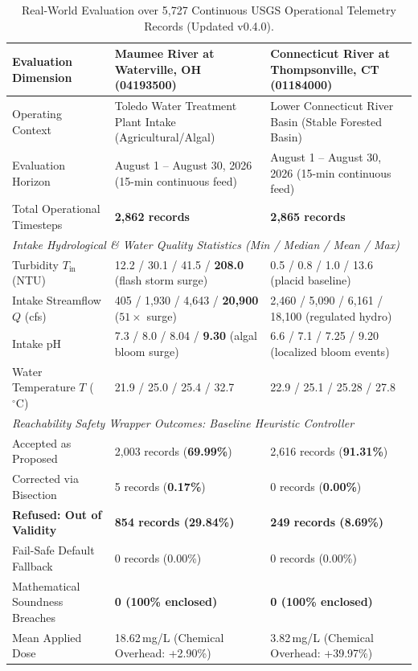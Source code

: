 \documentclass[10pt,twocolumn,letterpaper]{article}
\theoremstyle{definition}
\newcommand{\Tin}{T_{\text{in}}}
\begin{document}
\begin{table}[t]
\centering
\small
\caption{Real-World Evaluation over 5,727 Continuous USGS Operational Telemetry Records (Updated v0.4.0).}
\label{tab:real_world}
\begin{tabularx}{\textwidth}{lXX}
\toprule
\textbf{Evaluation Dimension} & \textbf{Maumee River at Waterville, OH (04193500)} & \textbf{Connecticut River at Thompsonville, CT (01184000)} \\
\midrule
Operating Context & Toledo Water Treatment Plant Intake (Agricultural/Algal) & Lower Connecticut River Basin (Stable Forested Basin) \\
Evaluation Horizon & August 1 -- August 30, 2026 (15-min continuous feed) & August 1 -- August 30, 2026 (15-min continuous feed) \\
Total Operational Timesteps & \textbf{2,862 records} & \textbf{2,865 records} \\
\midrule
\multicolumn{3}{l}{\textit{Intake Hydrological \& Water Quality Statistics (Min / Median / Mean / Max)}} \\
Turbidity $\Tin$ (NTU) & 12.2 / 30.1 / 41.5 / \textbf{208.0} (flash storm surge) & 0.5 / 0.8 / 1.0 / 13.6 (placid baseline) \\
Intake Streamflow $Q$ (cfs) & 405 / 1,930 / 4,643 / \textbf{20,900} ($51\times$ surge) & 2,460 / 5,090 / 6,161 / 18,100 (regulated hydro) \\
Intake pH & 7.3 / 8.0 / 8.04 / \textbf{9.30} (algal bloom surge) & 6.6 / 7.1 / 7.25 / 9.20 (localized bloom events) \\
Water Temperature $T$ ($^\circ\text{C}$) & 21.9 / 25.0 / 25.4 / 32.7 & 22.9 / 25.1 / 25.28 / 27.8 \\
\midrule
\multicolumn{3}{l}{\textit{Reachability Safety Wrapper Outcomes: Baseline Heuristic Controller}} \\
Accepted as Proposed & 2,003 records (\textbf{69.99\%}) & 2,616 records (\textbf{91.31\%}) \\
Corrected via Bisection & 5 records (\textbf{0.17\%}) & 0 records (\textbf{0.00\%}) \\
\textbf{Refused: Out of Validity} & \textbf{854 records (29.84\%)} & \textbf{249 records (8.69\%)} \\
Fail-Safe Default Fallback & 0 records (0.00\%) & 0 records (0.00\%) \\
Mathematical Soundness Breaches & \textbf{0 (100\% enclosed)} & \textbf{0 (100\% enclosed)} \\
Mean Applied Dose & 18.62\,mg/L (Chemical Overhead: +2.90\%) & 3.82\,mg/L (Chemical Overhead: +39.97\%) \\

\end{tabularx}
\end{table}
\end{document}
